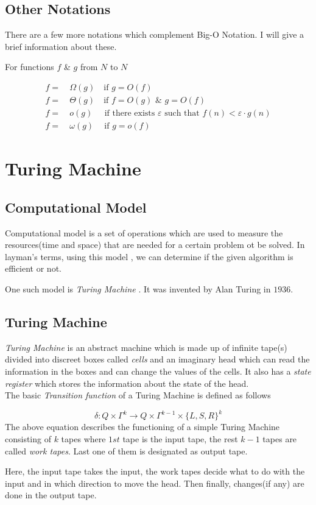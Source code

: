 \documentclass[12pt,a4paper]{extarticle}
\begin{document}
\subsection{Other Notations}
There are a few more notations which complement Big-O Notation. I will give a brief information about these.\par
For functions $f$ \& $g$ from $N$ to $N$

\begin{align}
f =&\:\Omega(g)\quad  \textrm{if} \,\,  g=O(f)\\
f =&\:\Theta(g)\quad \textrm{if} \,\,  f=O(g) \,\, \& \,\, g=O(f)\\
f =&\:o(g)\:\,\quad \textrm{if there exists }\varepsilon \textrm{ such that} \,\, f(n)<\varepsilon\cdot g(n) \\
f =&\:\omega(g)\quad \:\textrm{if} \,\,  g=o(f)
\end{align}

\section{Turing Machine}
\subsection{Computational Model}
Computational model is a set of operations which are used to measure the resources(time and space) that are needed for a certain problem ot be solved. In layman's terms, using this model , we can determine if the given algorithm is efficient or not. \par
One such model is \textit{Turing Machine} . It was invented by Alan Turing in $1936$. 
\subsection{Turing Machine}
\textit{Turing Machine} is an abstract machine which is made up of infinite tape(s) divided into discreet boxes called \textit{cells} and an imaginary head which can read the information in the boxes and can change the values of the cells. It also has a \textit{state register} which stores the information about the state of the head.\\
The basic \textit{Transition function} of a Turing Machine is defined as follows

\begin{equation}
\delta:Q\times\Gamma^k\longrightarrow Q\times\Gamma^{k-1}\times\{L,S,R\}^k
\end{equation}  
The above equation describes the functioning of a simple Turing Machine consisting of $k$ tapes where $1st$ tape is the input tape, the rest $k-1$ tapes are called \textit{work tapes}. Last one of them is designated as output tape.\par
Here, the input tape takes the input, the work tapes decide what to do with the input and in which direction to move the head. Then finally, changes(if any) are done in the output tape.\par
 
\end{document}
